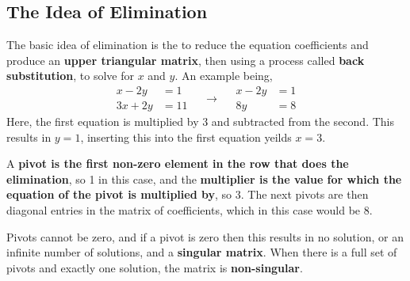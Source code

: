     \subsection{The Idea of Elimination}
        The basic idea of elimination is the to reduce the equation coefficients and produce an 
        \textbf{upper triangular matrix}, then using a process called \textbf{back substitution}, to solve for \(x\) and
        \(y\). An example being,
        \begin{equation}
            \begin{split}
                x - 2y &= 1 \\
                3x + 2y &= 11
            \end{split}
            \quad \rightarrow \quad
            \begin{split}
                x - 2y &= 1 \\
                8y &= 8
            \end{split}
        \end{equation}
        Here, the first equation is multiplied by 3 and subtracted from the second. This results in \(y = 1\), 
        inserting this into the first equation yeilds \(x = 3\). 
        \par \hfill \break
        A \textbf{pivot is the first non-zero element in the row that does the elimination}, so 1 in this case, and the 
        \textbf{multiplier is the value for which the equation of the pivot is multiplied by}, so 3. The next pivots are
        then diagonal entries in the matrix of coefficients, which in this case would be 8.
        \par \hfill \break
        Pivots cannot be zero, and if a pivot is zero then this results in no solution, or an infinite number of 
        solutions, and a \textbf{singular matrix}. When there is a full set of pivots and exactly one solution, 
        the matrix is \textbf{non-singular}.

